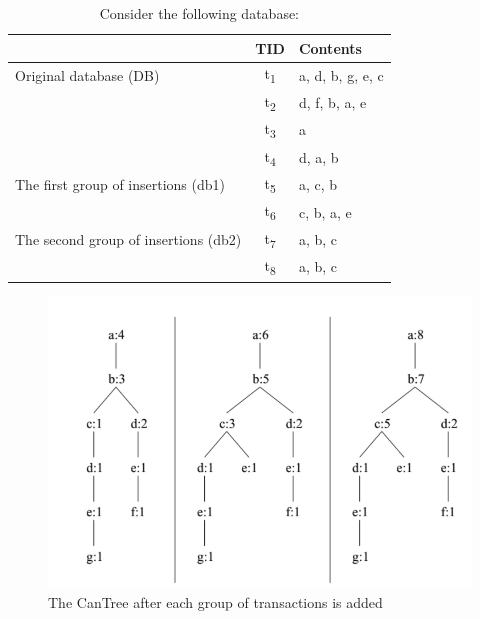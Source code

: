 \begin{table}[h!]
  \begin{center}
    \caption{Consider the following database:}
    \label{tab:table1}
    \begin{tabular}{l|c|l} %
      \textbf{} & \textbf{TID} & \textbf{Contents}\\
      \hline
      Original database (DB) & t\textsubscript{1} & {a, d, b, g, e, c}\\
       & t\textsubscript{2} & {d, f, b, a, e}\\
        & t\textsubscript{3} & {a}\\
	   & t\textsubscript{4} & {d, a, b}\\
       The first group of insertions (db1) & t\textsubscript{5} & {a, c, b}\\
        & t\textsubscript{6} & {c, b, a, e}\\
       The second group of insertions (db2) & t\textsubscript{7} & {a, b, c}\\
        & t\textsubscript{8} & {a, b, c} \\
    \end{tabular}
  \end{center}
\end{table}

\begin{figure}
  \centering
  \includegraphics[width=\linewidth]{figures/CanTreeExample}
  \caption{The CanTree after each group of transactions is added}
  \label{fig:CanTreeExample}
\end{figure}

